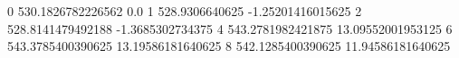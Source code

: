 0 530.1826782226562 0.0
1 528.9306640625 -1.25201416015625
2 528.8141479492188 -1.3685302734375
4 543.2781982421875 13.09552001953125
6 543.3785400390625 13.19586181640625
8 542.1285400390625 11.94586181640625
